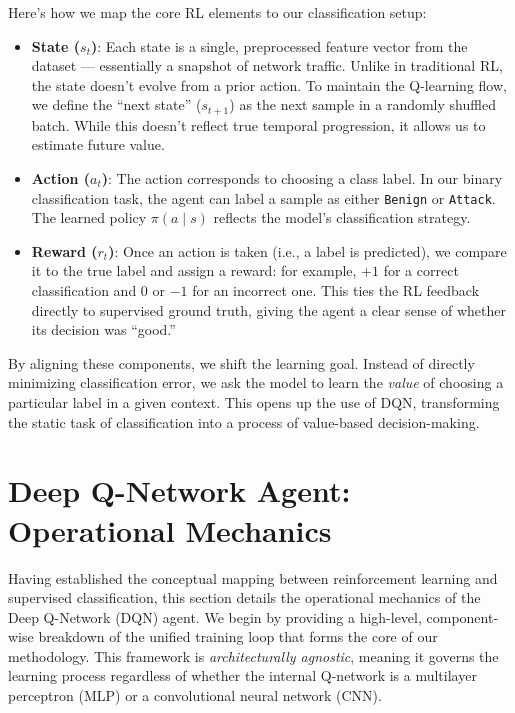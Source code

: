 \documentclass{report}
\begin{document}
Here's how we map the core RL elements to our classification setup:

\begin{itemize}
    \item \textbf{State ($s_t$)}: Each state is a single, preprocessed feature vector from the dataset — essentially a snapshot of network traffic. Unlike in traditional RL, the state doesn’t evolve from a prior action. To maintain the Q-learning flow, we define the ``next state'' ($s_{t+1}$) as the next sample in a randomly shuffled batch. While this doesn’t reflect true temporal progression, it allows us to estimate future value.

    \item \textbf{Action ($a_t$)}: The action corresponds to choosing a class label. In our binary classification task, the agent can label a sample as either \texttt{Benign} or \texttt{Attack}. The learned policy $\pi(a \mid s)$ reflects the model’s classification strategy.

    \item \textbf{Reward ($r_t$)}: Once an action is taken (i.e., a label is predicted), we compare it to the true label and assign a reward: for example, $+1$ for a correct classification and $0$ or $-1$ for an incorrect one. This ties the RL feedback directly to supervised ground truth, giving the agent a clear sense of whether its decision was ``good.''
\end{itemize}

By aligning these components, we shift the learning goal. Instead of directly minimizing classification error, we ask the model to learn the \textit{value} of choosing a particular label in a given context. This opens up the use of DQN, transforming the static task of classification into a process of value-based decision-making.

\section{Deep Q-Network Agent: Operational Mechanics}

Having established the conceptual mapping between reinforcement learning and supervised classification, this section details the operational mechanics of the Deep Q-Network (DQN) agent. We begin by providing a high-level, component-wise breakdown of the unified training loop that forms the core of our methodology. This framework is \textit{architecturally agnostic}, meaning it governs the learning process regardless of whether the internal Q-network is a multilayer perceptron (MLP) or a convolutional neural network (CNN).
\end{document}
